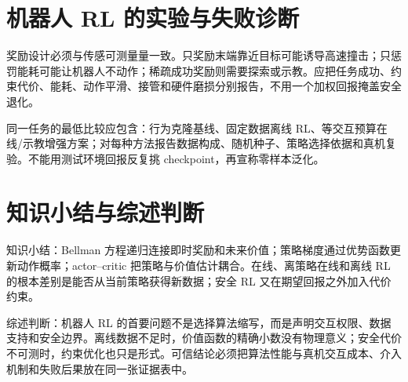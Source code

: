 \section{机器人 RL 的实验与失败诊断}

奖励设计必须与传感可测量量一致。只奖励末端靠近目标可能诱导高速撞击；只惩罚能耗可能让机器人不动作；稀疏成功奖励则需要探索或示教。应把任务成功、约束代价、能耗、动作平滑、接管和硬件磨损分别报告，不用一个加权回报掩盖安全退化。

同一任务的最低比较应包含：行为克隆基线、固定数据离线 RL、等交互预算在线/示教增强方案；对每种方法报告数据构成、随机种子、策略选择依据和真机复验。不能用测试环境回报反复挑 checkpoint，再宣称零样本泛化。

\section{知识小结与综述判断}

知识小结：Bellman 方程递归连接即时奖励和未来价值；策略梯度通过优势函数更新动作概率；actor--critic 把策略与价值估计耦合。在线、离策略在线和离线 RL 的根本差别是能否从当前策略获得新数据；安全 RL 又在期望回报之外加入代价约束。

综述判断：机器人 RL 的首要问题不是选择算法缩写，而是声明交互权限、数据支持和安全边界。离线数据不足时，价值函数的精确小数没有物理意义；安全代价不可测时，约束优化也只是形式。可信结论必须把算法性能与真机交互成本、介入机制和失败后果放在同一张证据表中。

